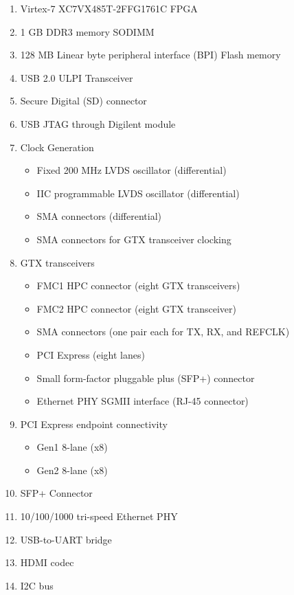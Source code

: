 \begin{enumerate}

  \item Virtex-7 XC7VX485T-2FFG1761C FPGA
  \item 1 GB DDR3 memory SODIMM
  \item 128 MB Linear byte peripheral interface (BPI) Flash memory
  \item USB 2.0 ULPI Transceiver
  \item Secure Digital (SD) connector
  \item USB JTAG through Digilent module
  \item Clock Generation

  \begin{itemize}
    \item Fixed 200 MHz LVDS oscillator (differential)
    \item IIC programmable LVDS oscillator (differential)
    \item SMA connectors (differential)
    \item SMA connectors for GTX transceiver clocking
  \end{itemize}

  \item GTX transceivers

  \begin{itemize}
    \item FMC1 HPC connector (eight GTX transceivers)
    \item FMC2 HPC connector (eight GTX transceiver)
    \item SMA connectors (one pair each for TX, RX, and REFCLK)
    \item PCI Express (eight lanes)
    \item Small form-factor pluggable plus (SFP+) connector
    \item Ethernet PHY SGMII interface (RJ-45 connector)
  \end{itemize}

  \item PCI Express endpoint connectivity

  \begin{itemize}
    \item Gen1 8-lane (x8)
    \item Gen2 8-lane (x8)
  \end{itemize}

  \item SFP+ Connector
  \item 10/100/1000 tri-speed Ethernet PHY
  \item USB-to-UART bridge
  \item HDMI codec
  \item I2C bus


\end{enumerate}
